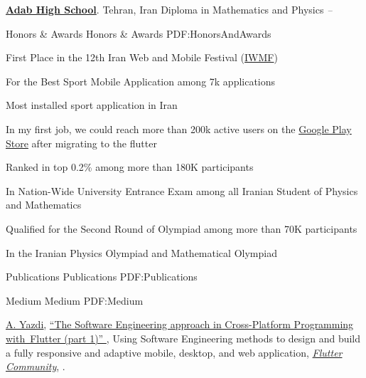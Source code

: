 \documentclass[letterpaper,MMMyyyy,nonstopmode]{resume}
\begin{document}
\begin{Body}
\BigGap
\Entry
\href{http://adab.sch.ir/HSchool}
{\textbf{Adab High School}}.
\small{Tehran, Iran}
\Gap
\BulletItem
Diploma in Mathematics and Physics
\hfill
\textsl{\small{ -- }}


\Section
{Honors \&\newline
Awards}
{Honors \& Awards}
{PDF:HonorsAndAwards}

\BulletItem
First Place in the 12th Iran Web and Mobile Festival
(\href{https://iwmf.ir}
{\small{IWMF}}) 
\hfill
\textsl{\small{}}
\begin{Detail}
\SubBulletItem
For the Best Sport Mobile Application among 7k applications
\end{Detail}

\Gap
\BulletItem
Most installed sport application in Iran
\hfill
\textsl{\small{}}
\begin{Detail}
\SubBulletItem
In my first job, we could reach more than 200k active users on the
\href{https://play.google.com/store/apps/details?id=com.tarafdari.news}
{Google Play Store} after migrating to the flutter
\end{Detail}

\Gap
\BulletItem
Ranked in top 0.2\% among more than 180K participants
\hfill
\textsl{\small{}}
\begin{Detail}
\SubBulletItem
In Nation-Wide University Entrance Exam among
all Iranian Student of Physics and Mathematics
\end{Detail}

\Gap
\BulletItem
Qualified for the Second Round of Olympiad
among more than 70K participants
\hfill
\textsl{\small{}}
\begin{Detail}
\SubBulletItem
In the Iranian Physics Olympiad and Mathematical Olympiad
\end{Detail}


\Section
{Publications}
{Publications}
{PDF:Publications}

\SubSection
{Medium}
{Medium}
{PDF:Medium}

\begingroup
\renewcommand{\MaxNumberedItem}{[88]}

\NumberedItem{[1]}
\href{https://medium.com/@aliyazdi75}
{\underline{A. Yazdi}},
\href{https://medium.com/flutter-community/the-software-engineering-approach-in-cross-platform-programming-with-flutter-part-1-efcdc8a8fc26}
{
``The Software Engineering approach in Cross-Platform Programming  with Flutter (part 1)''
},
Using Software Engineering methods to design and build a fully responsive and adaptive mobile, desktop, and web application,
\href{https://medium.com/flutter-community}
{\textit{Flutter Community}},
.


\end{Body}
\end{document}
